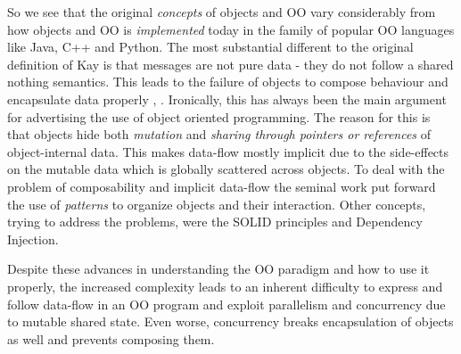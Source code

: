 

So we see that the original \textit{concepts} of objects and OO vary considerably from how objects and OO is \textit{implemented} today in the family of popular OO languages like Java, C++ and Python. The most substantial different to the original definition of Kay is that messages are not pure data - they do not follow a shared nothing semantics. This leads to the failure of objects to compose behaviour and encapsulate data properly \cite{bill_what_2017}, \cite{erkki_lindpere_why_2013}. Ironically, this has always been the main argument for advertising the use of object oriented programming. The reason for this is that objects hide both \textit{mutation} and \textit{sharing through pointers or references} of object-internal data. This makes data-flow mostly implicit due to the side-effects on the mutable data which is globally scattered across objects. To deal with the problem of composability and implicit data-flow the seminal work \cite{gamma_design_1994} put forward the use of \textit{patterns} to organize objects and their interaction. Other concepts, trying to address the problems, were the SOLID principles and Dependency Injection. 

Despite these advances in understanding the OO paradigm and how to use it properly, the increased complexity leads to an inherent difficulty to express and follow data-flow in an OO program and exploit parallelism and concurrency due to mutable shared state. Even worse, concurrency breaks encapsulation of objects as well and prevents composing them. 

